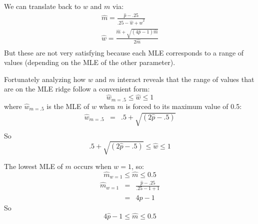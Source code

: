 \documentclass[11pt]{article}
\begin{document}
We can translate back to $w$ and $m$ via:
\begin{eqnarray*} 
	\hat m = \frac{\hat p - .25}{.25 - \hat w + \hat w^2} \\
	\hat w = \frac{\hat m + \sqrt{(4\hat p - 1)\hat m}}{2 \hat m} \\
\end{eqnarray*} 
But these are not very satisfying because each MLE corresponds to a range of values (depending on the MLE of the other parameter).

Fortunately analyzing how $w$ and $m$ interact reveals that the range of values that are on the MLE ridge follow a convenient form:
$$ \hat w_{m=.5}\leq\hat w \leq 1$$
where $\hat w_{m=.5}$   is the MLE of $w$ when $m$ is forced to its maximum value of 0.5:
\begin{eqnarray*} 
	\hat w_{m=.5} & = & .5 + \sqrt{(2\hat p - .5)} \\
\end{eqnarray*} 
So
$$ .5 + \sqrt{(2\hat p - .5)}\leq\hat w \leq 1$$

The lowest MLE of $m$ occurs when $w=1$, so:
$$ \hat m_{w=1} \leq \hat m \leq 0.5 $$
\begin{eqnarray*} 
	\hat m_{w=1} & = &\frac{\hat p - .25}{.25 - 1 + 1} \\
	& = & 4 \hat p - 1
\end{eqnarray*} 
So
$$ 4 \hat p - 1 \leq \hat m \leq 0.5 $$
\end{document}
